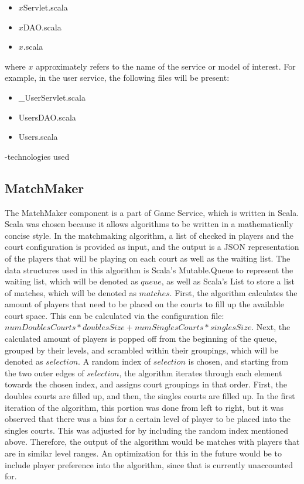 \documentclass{article}
\begin{document}
\begin{itemize}
  \item $x$Servlet.scala
  \item $x$DAO.scala
  \item $x$.scala
\end{itemize}

where $x$ approximately refers to the name of the service or model of interest. For example, in the user service, the following files will be present:

\begin{itemize}
  \item \_UserServlet.scala
  \item UsersDAO.scala
  \item Users.scala
\end{itemize}

-technologies used

\subsection{MatchMaker}
The MatchMaker component is a part of Game Service, which is written in Scala. Scala was chosen because it allows algorithms to be written in a mathematically concise style. In the matchmaking algorithm, a list of checked in players and the court configuration is provided as input, and the output is a JSON representation of the players that will be playing on each court as well as the waiting list. The data structures used in this algorithm is Scala's Mutable.Queue to represent the waiting list, which will be denoted as $queue$, as well as Scala's List to store a list of matches, which will be denoted as $matches$. First, the algorithm calculates the amount of players that need to be placed on the courts to fill up the available court space. This can be calculated via the configuration file: $numDoublesCourts * doublesSize + numSinglesCourts * singlesSize$. Next, the calculated amount of players is popped off from the beginning of the queue, grouped by their levels, and scrambled within their groupings, which will be denoted as $selection$. A random index of $selection$ is chosen, and starting from the two outer edges of $selection$, the algorithm iterates through each element towards the chosen index, and assigns court groupings in that order. First, the doubles courts are filled up, and then, the singles courts are filled up. In the first iteration of the algorithm, this portion was done from left to right, but it was observed that there was a bias for a certain level of player to be placed into the singles courts. This was adjusted for by including the random index mentioned above. Therefore, the output of the algorithm would be matches with players that are in similar level ranges. An optimization for this in the future would be to include player preference into the algorithm, since that is currently unaccounted for.
\end{document}
